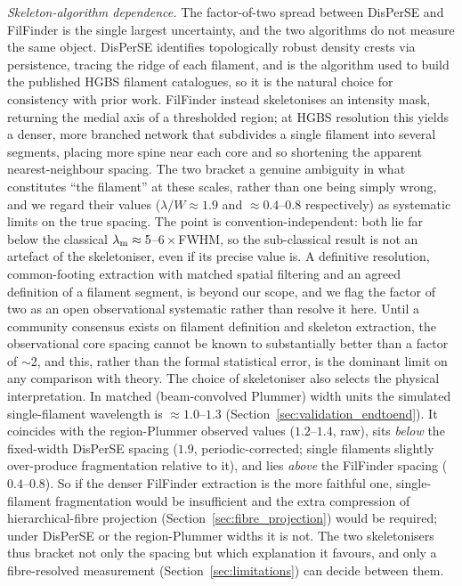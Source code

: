 \documentclass[usenatbib,twoside,twocolumn]{mnras}
\begin{document}
\emph{Skeleton-algorithm dependence.} The factor-of-two spread between DisPerSE and FilFinder is the single largest uncertainty, and the two algorithms do not measure the same object. DisPerSE identifies topologically robust density crests via persistence, tracing the ridge of each filament, and is the algorithm used to build the published HGBS filament catalogues, so it is the natural choice for consistency with prior work. FilFinder instead skeletonises an intensity mask, returning the medial axis of a thresholded region; at HGBS resolution this yields a denser, more branched network that subdivides a single filament into several segments, placing more spine near each core and so shortening the apparent nearest-neighbour spacing. The two bracket a genuine ambiguity in what constitutes ``the filament'' at these scales, rather than one being simply wrong, and we regard their values ($\lambda/W\approx1.9$ and $\approx0.4$--$0.8$ respectively) as systematic limits on the true spacing. The point is convention-independent: both lie far below the classical $\lambda_{\rm m}\approx5$--$6\times$FWHM, so the sub-classical result is not an artefact of the skeletoniser, even if its precise value is. A definitive resolution, common-footing extraction with matched spatial filtering and an agreed definition of a filament segment, is beyond our scope, and we flag the factor of two as an open observational systematic rather than resolve it here. Until a community consensus exists on filament definition and skeleton extraction, the observational core spacing cannot be known to substantially better than a factor of $\sim$2, and this, rather than the formal statistical error, is the dominant limit on any comparison with theory. The choice of skeletoniser also selects the physical interpretation. In matched (beam-convolved Plummer) width units the simulated single-filament wavelength is $\approx1.0$--$1.3$ (Section~\ref{sec:validation_endtoend}). It coincides with the region-Plummer observed values ($1.2$--$1.4$, raw), sits \emph{below} the fixed-width DisPerSE spacing ($1.9$, periodic-corrected; single filaments slightly over-produce fragmentation relative to it), and lies \emph{above} the FilFinder spacing ($0.4$--$0.8$). So if the denser FilFinder extraction is the more faithful one, single-filament fragmentation would be insufficient and the extra compression of hierarchical-fibre projection (Section~\ref{sec:fibre_projection}) would be required; under DisPerSE or the region-Plummer widths it is not. The two skeletonisers thus bracket not only the spacing but which explanation it favours, and only a fibre-resolved measurement (Section~\ref{sec:limitations}) can decide between them.
\end{document}
